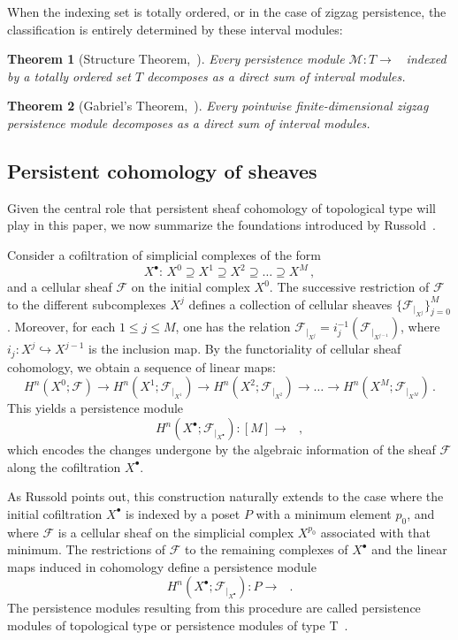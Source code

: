 \documentclass[reqno,12pt]{amsart}
\newcommand{\cF}{{\mathcal F}}
\newcommand{\cM}{\mathcal{M}}
\DeclareMathOperator{\vect}{\mathbf{vect}_\Bbbk}
\newcommand{\0}{\mathbf 0}
\newtheorem{theorem}{Theorem}[section]
\theoremstyle{definition}
\begin{document}
When the indexing set is totally ordered, or in the case of zigzag persistence, the classification is entirely determined by these interval modules:

\begin{theorem}[Structure Theorem,{~\cite[Theorem 1.2]{Bakke_Crawley20}}]\label{Thm:Descomposicion}
Every persistence module $\cM\colon T\to \vect$ indexed by a totally ordered set $T$ decomposes as a direct sum of interval modules.
\end{theorem}

\begin{theorem}[{Gabriel's Theorem,~\cite[Theorem 2.5]{Carlsson_Silva10}}]\label{Thm:Gabriel}
Every pointwise finite-dimensional zigzag persistence module decomposes as a direct sum of interval modules.
\end{theorem}


\subsection{Persistent cohomology of sheaves}\label{Sec:Cohomologiapersistentehaces}

Given the central role that persistent sheaf cohomology of topological type will play in this paper, we now summarize the foundations introduced by Russold~\cite{Russold22}. 

Consider a cofiltration of simplicial complexes of the form
\[
X^{\bullet}\colon \,X^0 \supseteq X^1 \supseteq X^2 \supseteq \dots \supseteq X^M\,,
\]
and a cellular sheaf $\cF$ on the initial complex $X^0$. The successive restriction of $\cF$ to the different subcomplexes $X^j$ defines a collection of cellular sheaves $\{\cF_{|_{X^j}}\}_{j=0}^M$. Moreover, for each $1\leq j\leq M$, one has the relation  $\cF_{|_{X^j}}=i_j^{-1}(\cF_{|_{X^{j-1}}})$, where $i_j\colon X^{j}\hookrightarrow X^{j-1}$ is the inclusion map. By the functoriality of cellular sheaf cohomology, we obtain a sequence of linear maps:
\begin{equation*}
H^n(X^0;\cF)\longrightarrow H^n(X^1;\cF_{|_{X^1}})\longrightarrow H^n(X^2;\cF_{|_{X^2}})\longrightarrow \dots \longrightarrow H^n(X^M;\cF_{|_{X^M}})\,.
\end{equation*}
This yields a persistence module 
\[
H^{n}(X^\bullet;\cF_{|_{X^\bullet}})\colon [M]\to \vect\,,
\]
which encodes the changes undergone by the algebraic information of the sheaf $\cF$ along the cofiltration $X^\bullet$.

As Russold points out, this construction naturally extends to the case where the initial cofiltration $X^\bullet$ is indexed by a poset $P$ with a minimum element $p_0$, and where $\cF$ is a cellular sheaf on the simplicial complex $X^{p_0}$ associated with that minimum. The restrictions of $\cF$ to the remaining complexes of $X^\bullet$ and the linear maps induced in cohomology define a persistence module 
\[
H^{n}(X^\bullet;\cF_{|_{X^\bullet}})\colon P\to \vect\,.
\]
The persistence modules resulting from this procedure are called persistence modules of topological type or persistence modules of type T~\cite{Russold22}.
\end{document}
